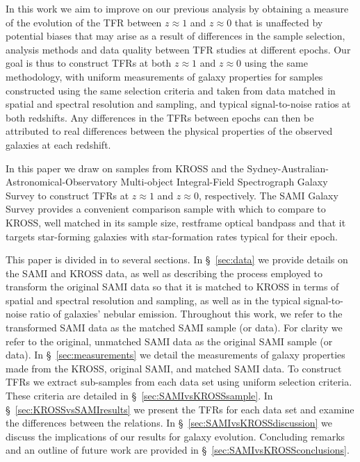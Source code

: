 \documentclass[a4paper,fleqn,usenatbib]{mnras}
\begin{document}
In this work we aim to improve on our previous analysis by obtaining a measure of the evolution of the TFR between $z\approx1$ and $z\approx0$ that is unaffected by potential biases that may arise as a result of differences in the sample selection, analysis methods and data quality between TFR studies at different epochs. Our goal is thus to construct TFRs at both $z\approx1$ and $z\approx0$ using the same methodology, with uniform measurements of galaxy properties for samples constructed using the same selection criteria and taken from data matched in spatial and spectral resolution and sampling, and typical signal-to-noise ratios at both redshifts. Any differences in the TFRs between epochs can then be attributed to real differences between the physical properties of the observed galaxies at each redshift. 

In this paper we draw on samples from KROSS and the Sydney-Australian-Astronomical-Observatory Multi-object Integral-Field Spectrograph \citep[SAMI;][]{Croom:2012} Galaxy Survey \citep[e.g.][]{Bryant:2015} to construct TFRs at $z\approx1$ and $z\approx0$, respectively. The SAMI Galaxy Survey provides a convenient comparison sample with which to compare to KROSS, well matched in its sample size, restframe optical bandpass and that it targets star-forming galaxies with star-formation rates typical for their epoch.

This paper is divided in to several sections. In \S~\ref{sec:data} we provide details on the SAMI and KROSS data, as well as describing the process employed to transform the original SAMI data so that it is matched to KROSS in terms of spatial and spectral resolution and sampling, as well as in the typical signal-to-noise ratio of galaxies' nebular emission. Throughout this work, we refer to the transformed SAMI data as the matched SAMI sample (or data). For clarity we refer to the original, unmatched SAMI data as the original SAMI sample (or data). In \S~\ref{sec:measurements} we detail the measurements of galaxy properties made from the KROSS, original SAMI, and matched SAMI data. To construct TFRs we extract sub-samples from each data set using uniform selection criteria. These criteria are detailed in \S~\ref{sec:SAMIvsKROSSsample}. In \S~\ref{sec:KROSSvsSAMIresults} we present the TFRs for each data set and examine the differences between the relations. In \S~\ref{sec:SAMIvsKROSSdiscussion} we discuss the implications of our results for galaxy evolution. Concluding remarks and an outline of future work are provided in \S~\ref{sec:SAMIvsKROSSconclusions}.  
\end{document}
